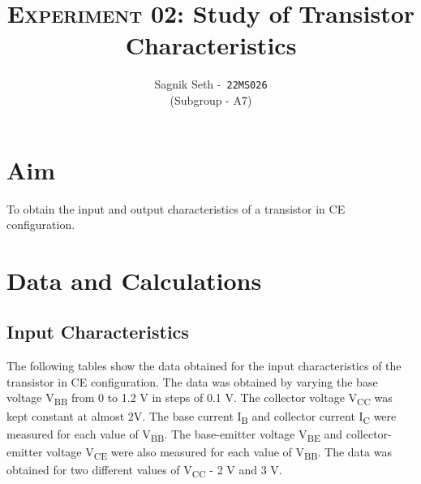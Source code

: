 \documentclass{scrartcl}
\title{
        \Large\textsc{Experiment 02: }
        \huge\textbf{Study of Transistor Characteristics} \\
}
\author{{\Large Sagnik Seth} -\   \texttt{22MS026}\\ ({\small Subgroup - A7}) }
\date{}
\begin{document}
\maketitle
\section{Aim}
To obtain the input and output characteristics of a transistor in CE configuration.
 
\section{Data and Calculations}
\subsection{Input Characteristics}
The following tables show the data obtained for the input characteristics of the transistor in CE configuration. The data was obtained by varying the base voltage V\textsubscript{BB} from 0 to 1.2 V in steps of 0.1 V. The collector voltage V\textsubscript{CC} was kept constant at almost $\mathrm{2 V}$. The base current I\textsubscript{B} and collector current I\textsubscript{C} were measured for each value of V\textsubscript{BB}. The base-emitter voltage V\textsubscript{BE} and collector-emitter voltage V\textsubscript{CE} were also measured for each value of V\textsubscript{BB}. The data was obtained for two different values of V\textsubscript{CC} - 2 V and 3 V. 
\end{document}

